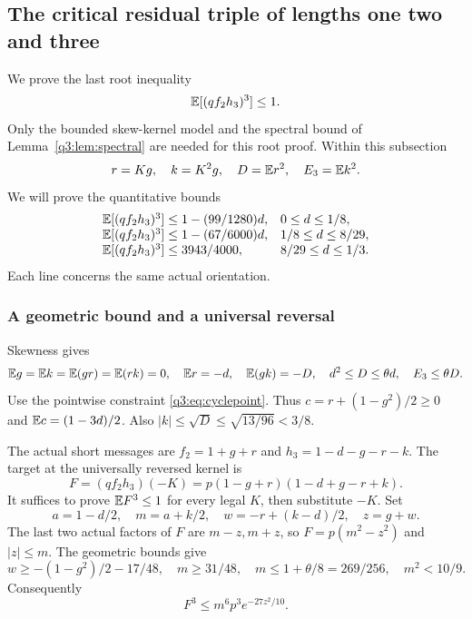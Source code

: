 \subsection{The critical residual triple of lengths one two and three}\label{q3:app:critical}
We prove the last root inequality
\begin{equation}\label{q3:eq:criticaltarget}
 \mathbb E[(qf_2h_3)^3]\le1 .
\end{equation}
Only the bounded skew-kernel model and the spectral bound of Lemma~\ref{q3:lem:spectral} are needed for this root proof. Within this subsection
\[
 r=Kg,\quad k=K^2g,\quad D=\mathbb E r^2,\quad E_3=\mathbb E k^2 .
\]
We will prove the quantitative bounds
\begin{equation}\label{q3:eq:criticalranges}
\begin{array}{ll}
 \mathbb E[(qf_2h_3)^3]\le1-(99/1280)d,&0\le d\le1/8,\\
 \mathbb E[(qf_2h_3)^3]\le1-(67/6000)d,&1/8\le d\le8/29,\\
 \mathbb E[(qf_2h_3)^3]\le3943/4000,&8/29\le d\le1/3.
\end{array}
\end{equation}
Each line concerns the same actual orientation.

\subsubsection{A geometric bound and a universal reversal}
Skewness gives
\[
 \mathbb E g=\mathbb E k=\mathbb E(gr)=\mathbb E(rk)=0,\quad
 \mathbb E r=-d,\quad \mathbb E(gk)=-D,\quad d^2\le D\le\theta d,\quad E_3\le\theta D.
\]
Use the pointwise constraint \eqref{q3:eq:cyclepoint}.
Thus $c=r+(1-g^2)/2\ge0$ and $\mathbb E c=(1-3d)/2$.
Also $|k|\le\sqrt D\le\sqrt{13/96}<3/8$.

The actual short messages are $f_2=1+g+r$ and $h_3=1-d-g-r-k$.
The target at the universally reversed kernel is
\[
 F=(qf_2h_3)(-K)=p(1-g+r)(1-d+g-r+k).
\]
It suffices to prove $\mathbb E F^3\le1$ for every legal $K$, then substitute $-K$.
Set
\[
 a=1-d/2,\quad m=a+k/2,\quad w=-r+(k-d)/2,\quad z=g+w .
\]
The last two actual factors of $F$ are $m-z,m+z$, so
$F=p(m^2-z^2)$ and $|z|\le m$.
The geometric bounds give
\[
 w\ge-(1-g^2)/2-17/48,\quad m\ge31/48,\quad
 m\le1+\theta/8=269/256,\quad m^2<10/9 .
\]
Consequently
\begin{equation}\label{q3:eq:criticalexponential}
 F^3\le m^6p^3e^{-27z^2/10}.
\end{equation}


